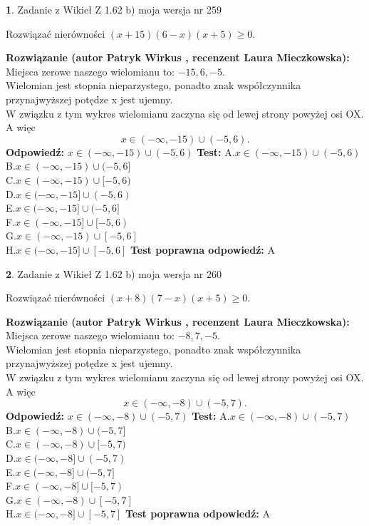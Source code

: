 \documentclass[12pt, a4paper]{article}
\theoremstyle{definition} %
\newtheorem{zad}{}
\newcommand{\zadStart}[1]{\begin{zad}#1\newline}
\newcommand{\zadStop}{\end{zad}}
\newcommand{\rozwStart}[2]{\noindent \textbf{Rozwiązanie (autor #1 , recenzent #2): }\newline}
\newcommand{\rozwStop}{\newline}
\newcommand{\odpStart}{\noindent \textbf{Odpowiedź:}\newline}
\newcommand{\odpStop}{\newline}
\newcommand{\testStart}{\noindent \textbf{Test:}\newline}
\newcommand{\testStop}{\newline}
\newcommand{\kluczStart}{\noindent \textbf{Test poprawna odpowiedź:}\newline}
\newcommand{\kluczStop}{\newline}
\begin{document}
\zadStart{Zadanie z Wikieł Z 1.62 b) moja wersja nr 259}

Rozwiązać nierówności $(x+15)(6-x)(x+5)\ge0$.
\zadStop
\rozwStart{Patryk Wirkus}{Laura Mieczkowska}
Miejsca zerowe naszego wielomianu to: $-15, 6, -5$.\\
Wielomian jest stopnia nieparzystego, ponadto znak współczynnika przy\linebreak najwyższej potędze x jest ujemny.\\ W związku z tym wykres wielomianu zaczyna się od lewej strony powyżej osi OX. A więc $$x \in (-\infty,-15) \cup (-5,6).$$
\rozwStop
\odpStart
$x \in (-\infty,-15) \cup (-5,6)$
\odpStop
\testStart
A.$x \in (-\infty,-15) \cup (-5,6)$\\
B.$x \in (-\infty,-15) \cup (-5,6]$\\
C.$x \in (-\infty,-15) \cup [-5,6)$\\
D.$x \in (-\infty,-15] \cup (-5,6)$\\
E.$x \in (-\infty,-15] \cup (-5,6]$\\
F.$x \in (-\infty,-15] \cup [-5,6)$\\
G.$x \in (-\infty,-15) \cup [-5,6]$\\
H.$x \in (-\infty,-15] \cup [-5,6]$
\testStop
\kluczStart
A
\kluczStop



\zadStart{Zadanie z Wikieł Z 1.62 b) moja wersja nr 260}

Rozwiązać nierówności $(x+8)(7-x)(x+5)\ge0$.
\zadStop
\rozwStart{Patryk Wirkus}{Laura Mieczkowska}
Miejsca zerowe naszego wielomianu to: $-8, 7, -5$.\\
Wielomian jest stopnia nieparzystego, ponadto znak współczynnika przy\linebreak najwyższej potędze x jest ujemny.\\ W związku z tym wykres wielomianu zaczyna się od lewej strony powyżej osi OX. A więc $$x \in (-\infty,-8) \cup (-5,7).$$
\rozwStop
\odpStart
$x \in (-\infty,-8) \cup (-5,7)$
\odpStop
\testStart
A.$x \in (-\infty,-8) \cup (-5,7)$\\
B.$x \in (-\infty,-8) \cup (-5,7]$\\
C.$x \in (-\infty,-8) \cup [-5,7)$\\
D.$x \in (-\infty,-8] \cup (-5,7)$\\
E.$x \in (-\infty,-8] \cup (-5,7]$\\
F.$x \in (-\infty,-8] \cup [-5,7)$\\
G.$x \in (-\infty,-8) \cup [-5,7]$\\
H.$x \in (-\infty,-8] \cup [-5,7]$
\testStop
\kluczStart
A
\kluczStop
\end{document}
